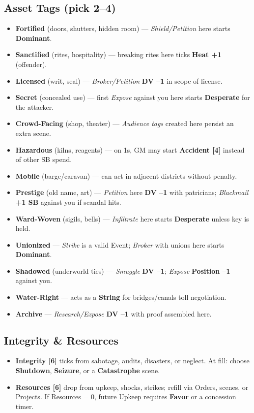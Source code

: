\documentclass[10pt]{article}
\begin{document}
\begin{center}
    \subsection{Asset Tags (pick 2--4)}
    \begin{itemize}
      \item \textbf{Fortified} (doors, shutters, hidden room) --- \emph{Shield/Petition} here starts \textbf{Dominant}.
      \item \textbf{Sanctified} (rites, hospitality) --- breaking rites here ticks \textbf{Heat +1} (offender).
      \item \textbf{Licensed} (writ, seal) --- \emph{Broker/Petition} \textbf{DV --1} in scope of license.
      \item \textbf{Secret} (concealed use) --- first \emph{Expose} against you here starts \textbf{Desperate} for the attacker.
      \item \textbf{Crowd-Facing} (shop, theater) --- \emph{Audience tags} created here persist an extra scene.
      \item \textbf{Hazardous} (kilns, reagents) --- on 1s, GM may start \textbf{Accident [4]} instead of other SB spend.
      \item \textbf{Mobile} (barge/caravan) --- can act in adjacent districts without penalty.
      \item \textbf{Prestige} (old name, art) --- \emph{Petition} here \textbf{DV --1} with patricians; \emph{Blackmail} \textbf{+1 SB} against you if scandal hits.
      \item \textbf{Ward-Woven} (sigils, bells) --- \emph{Infiltrate} here starts \textbf{Desperate} unless key is held.
      \item \textbf{Unionized} --- \emph{Strike} is a valid Event; \emph{Broker} with unions here starts \textbf{Dominant}.
      \item \textbf{Shadowed} (underworld ties) --- \emph{Smuggle} \textbf{DV --1}; \emph{Expose} \textbf{Position --1} against you.
      \item \textbf{Water-Right} --- acts as a \textbf{String} for bridges/canals toll negotiation.
      \item \textbf{Archive} --- \emph{Research/Expose} \textbf{DV --1} with proof assembled here.
    \end{itemize}
    
    \subsection{Integrity \& Resources}
    \begin{itemize}
      \item \textbf{Integrity [6]} ticks from sabotage, audits, disasters, or neglect. At fill: choose \textbf{Shutdown}, \textbf{Seizure}, or a \textbf{Catastrophe} scene.
      \item \textbf{Resources [6]} drop from upkeep, shocks, strikes; refill via Orders, scenes, or Projects. If Resources = 0, future Upkeep requires \textbf{Favor} or a concession timer.
    \end{itemize}
    

\end{center}
\end{document}
